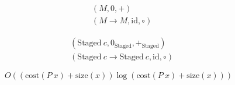 \documentclass[a4paper,12pt]{article}
\begin{document}
    \begin{align*}
        &(M,0,+)\\
        &(M\to M,\text{id},\circ)
    \end{align*}

    \begin{align*}
        &(\text{Staged}\ c,0_\text{Staged},+_\text{Staged})\\
        &(\text{Staged}\ c\to\text{Staged}\ c,\text{id},\circ)
    \end{align*}

    \begin{equation*}
        O((\text{cost}(P\ x)+\text{size}(x))\log(\text{cost}(P\ x)+\text{size}(x)))
    \end{equation*}
\end{document}
